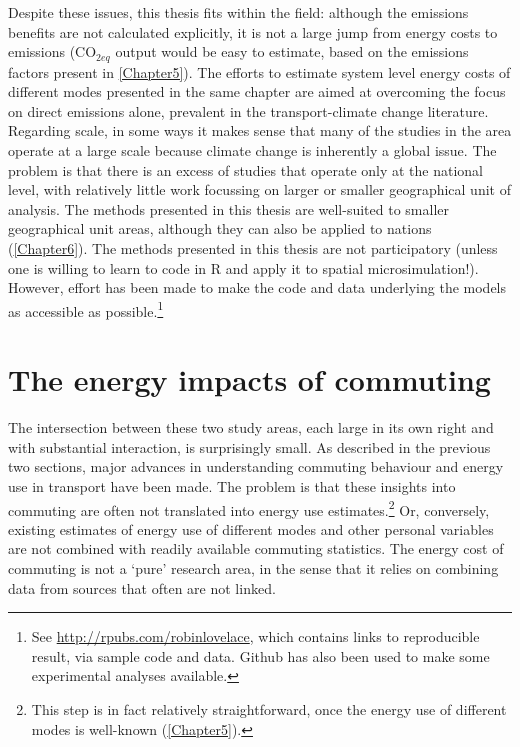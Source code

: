 Despite these issues, this thesis fits within the field: although the emissions
benefits are not calculated explicitly, it is not a large jump from energy
costs to emissions (CO$_{2eq}$ output
would be easy to estimate, based on the
emissions factors present in \cref{Chapter5}). The efforts to estimate
system level energy costs of different modes presented in the same chapter
are aimed at overcoming the focus on direct emissions alone, prevalent in the
transport-climate change literature. Regarding scale, in some ways it makes
sense that many of the studies in the area operate at a large scale
because climate change is inherently a global issue.
The problem is that there is an excess of studies that operate only at the
national level, with relatively little work focussing on larger or smaller geographical
unit of analysis. The methods
presented in this thesis are well-suited to smaller geographical unit areas, although
they can also be applied to nations (\cref{Chapter6}).
The methods presented in this thesis are not participatory (unless one is
willing to learn to code in R and apply it to spatial microsimulation!).
However, effort has been made to make the code and data underlying the
models as accessible as possible.\footnote{See
\url{http://rpubs.com/robinlovelace}, which contains links to
reproducible result, via sample code and data. Github has also
been used to make some experimental analyses available.
}


\section{The energy impacts of commuting} \label{sdisciplines}
The intersection between these two study areas, each large in its own
right and with substantial interaction, is surprisingly small.
As described in the previous two sections, major advances in understanding
commuting behaviour and energy use in transport have been made.
The problem is that these insights into commuting are often not
translated into energy use
estimates.\footnote{This step is in fact
relatively straightforward, once the energy use of different modes is well-known
(\cref{Chapter5}).
}
Or, conversely, existing estimates of energy use of different modes and
other personal variables are not combined with readily available
commuting statistics. The energy cost of commuting is not a
`pure' research area, in the sense that it relies on combining data from
sources that often are not linked.

